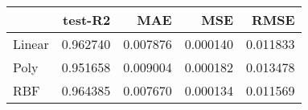 \begin{tabular}{lrrrr}
\toprule
{} &   test-R2 &       MAE &       MSE &      RMSE \\
\midrule
Linear &  0.962740 &  0.007876 &  0.000140 &  0.011833 \\
Poly   &  0.951658 &  0.009004 &  0.000182 &  0.013478 \\
RBF    &  0.964385 &  0.007670 &  0.000134 &  0.011569 \\
\bottomrule
\end{tabular}
